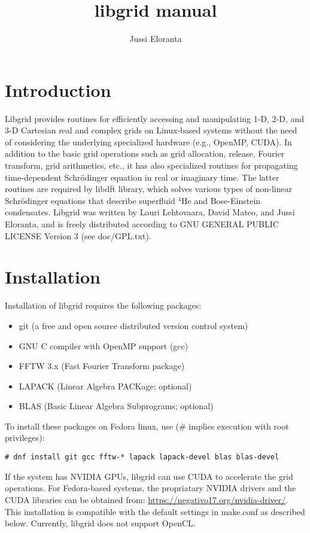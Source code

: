 \documentclass[12pt,letterpaper]{article}
\author{Jussi Eloranta}
\title{libgrid manual}
\begin{document}
\section{Introduction}

Libgrid provides routines for efficiently accessing and manipulating 1-D, 2-D, and 3-D Cartesian real and complex grids on Linux-based systems without the need of considering the underlying specialized hardware (e.g., OpenMP, CUDA). In addition to the basic grid operations such as grid allocation, release, Fourier transform, grid arithmetics, etc., it has also specialized routines for propagating time-dependent Schr\"odinger equation in real or imaginary time. The latter routines are required by libdft library, which solves various types of non-linear Schr\"odinger equations that describe superfluid $^4$He and Bose-Einstein condensates. Libgrid was written by Lauri Lehtovaara, David Mateo, and Jussi Eloranta, and is freely distributed according to GNU GENERAL PUBLIC LICENSE Version 3 (see doc/GPL.txt).

\section{Installation}

Installation of libgrid requires the following packages:
\begin{itemize}
\item git (a free and open source distributed version control system)
\item GNU C compiler with OpenMP support (gcc)
\item FFTW 3.x (Fast Fourier Transform package)
\item LAPACK (Linear Algebra PACKage; optional)
\item BLAS (Basic Linear Algebra Subprograms; optional)
\end{itemize}
To install these packages on Fedora linux, use (\# implies execution with root privileges): 
\begin{verbatim}
# dnf install git gcc fftw-* lapack lapack-devel blas blas-devel
\end{verbatim}
If the system has NVIDIA GPUs, libgrid can use CUDA to accelerate the grid operations. For Fedora-based systems, the propriatary NVIDIA drivers and the CUDA libraries can be obtained from: \url{https://negativo17.org/nvidia-driver/}. This installation is compatible with the default settings in make.conf as described below. Currently, libgrid does not support OpenCL.
\end{document}
